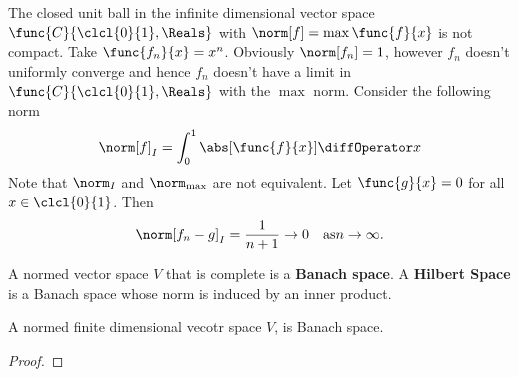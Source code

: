 

\begin{example}
    The closed unit ball in the infinite dimensional vector space \(\func{C}{\clcl{0}{1},\Reals}\) with \(\norm[f] = \max \func{f}{x}\) is not compact.  Take \(\func{f_n}{x} = x^n\). Obviously \(\norm[f_n] = 1\), however \(f_n\) doesn't uniformly converge and hence \(f_n\) doesn't have a limit in \(\func{C}{\clcl{0}{1},\Reals}\) with the \(\max\) norm. Consider the following norm
    \begin{equation*}
        \norm[f]_I = \int_0^1 \abs[\func{f}{x}] \diffOperator x
    \end{equation*}
    Note that \(\norm_I\) and \(\norm_{\max} \) are not equivalent. Let \(\func{g}{x} = 0\) for all \(x \in \clcl{0}{1}\). Then
    \begin{equation*}
        \norm[f_n - g]_I = \dfrac{1}{n+1} \to 0 \quad \text{as} n \to \infty.
    \end{equation*}
\end{example}

\begin{definition}
    A normed vector space \(V\) that is complete is a \textbf{Banach space}. A \textbf{Hilbert Space} is a Banach space whose norm is induced by an inner product.
\end{definition}

\begin{proposition}
    A normed finite dimensional vecotr space \(V\), is Banach space.
\end{proposition}

\begin{proof}

\end{proof}

